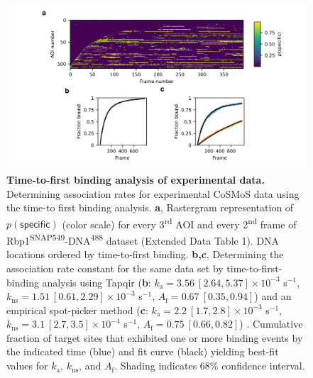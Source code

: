 \begin{figure}[t]
\centering
\includegraphics[width=\textwidth]{extended-data/figure3/figure3.png}
\caption{\textbf{Time-to-first binding analysis of experimental data.}  Determining association rates for experimental CoSMoS data using the time-to first binding analysis. \textbf{a}, Rastergram representation of $p(\mathsf{specific})$ (color scale) for every 3\textsuperscript{rd} AOI and every 2\textsuperscript{nd} frame of Rbp1\textsuperscript{SNAP549}-DNA\textsuperscript{488} dataset (Extended Data Table 1). DNA locations ordered by time-to-first binding. \textbf{b,c}, Determining the association rate constant for the same data set by  time-to-first-binding analysis using Tapqir (\textbf{b}: $k_\mathrm{a} = 3.56 \: [2.64, 5.37] \times 10^{-3}$ s$^{-1}$, $k_\mathrm{ns} = 1.51 \: [0.61, 2.29] \times 10^{-3}$ s$^{-1}$, $A_\mathrm{f} = 0.67 \: [0.35, 0.94]$) and an empirical spot-picker method (\textbf{c}: $k_\mathrm{a} = 2.2 \: [1.7, 2.8] \times 10^{-3}$ s$^{-1}$, $k_\mathrm{ns} = 3.1 \: [2.7, 3.5] \times 10^{-4}$ s$^{-1}$, $A_\mathrm{f} = 0.75 \: [0.66, 0.82]$) \cite{Rosen2020-zn}.   Cumulative fraction of target sites that exhibited one or more binding events by the indicated time (blue) and fit curve (black) yielding best-fit values for $k_\mathrm{a}$, $k_\mathrm{ns}$, and $A_\mathrm{f}$. Shading indicates 68\% confidence interval.
}
\label{fig:rpb1snap549}
\end{figure}
\pagebreak

